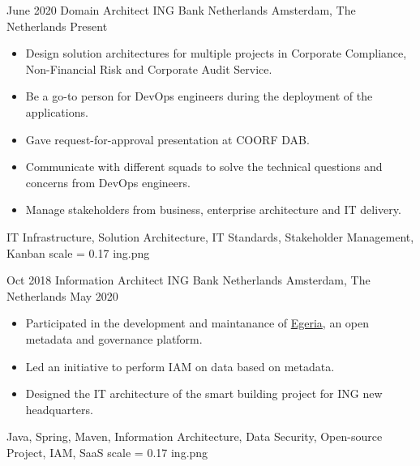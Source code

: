 %
%
%
%
%

\begin{experiences}
	\experience
	{June 2020} {Domain Architect} {ING Bank Netherlands} {Amsterdam, The Netherlands}
	{Present}{
		\begin{itemize}
			\item Design solution architectures for multiple projects in Corporate Compliance, Non-Financial Risk and Corporate Audit Service.
			\item Be a go-to person for DevOps engineers during the deployment of the applications. 
			\item Gave request-for-approval presentation at COORF DAB.
			\item Communicate with different squads to solve the technical questions and concerns from DevOps engineers.
			\item Manage stakeholders from business, enterprise architecture and IT delivery.
    \end{itemize}}
	{IT Infrastructure, Solution Architecture, IT Standards, Stakeholder Management, Kanban}
	{scale = 0.17}		{ing.png}
	
	\emptySeparator

	\experience
	{Oct 2018} {Information Architect} {ING Bank Netherlands} {Amsterdam, The Netherlands}
	{May 2020}{
		\begin{itemize}
			\item Participated in the development and maintanance of \href{https://github.com/odpi/egeria}{Egeria}, an open metadata and governance platform. 
			\item Led an initiative to perform IAM on data based on metadata.  
			\item Designed the IT architecture of the smart building project for ING new headquarters.
    \end{itemize}}
	{Java, Spring, Maven, Information Architecture, Data Security, Open-source Project, IAM, SaaS}
	{scale = 0.17}		{ing.png}


\end{experiences}
